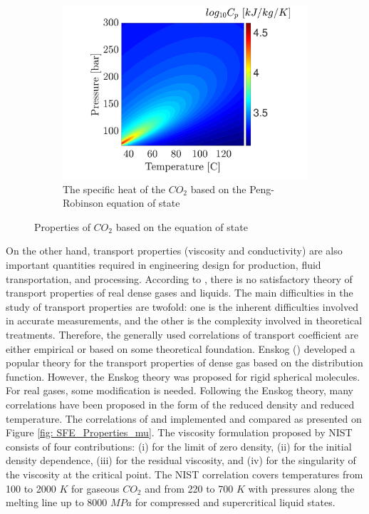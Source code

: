 \documentclass[../Article_Model_Parameters.tex]{subfiles}
\begin{document}
\begin{figure}[H]
			\hfill
			\begin{subfigure}[b]{0.95\textwidth}
				\centering
				\includegraphics[trim = 2.9cm 7cm 3.cm 7cm,clip,width=\textwidth]{Figures/CP.pdf}	
				\caption{The specific heat of the $CO_2$ based on the Peng-Robinson equation of state}
                \label{fig: SFE_Properties_CP}
			\end{subfigure}
			\caption{Properties of $CO_2$ based on the equation of state}
			\label{fig: SFE_Properties}
		\end{figure}    

        On the other hand, transport properties (viscosity and conductivity) are also important quantities required in engineering design for production, fluid transportation, and processing. According to \citet{Sheng1989}, there is no satisfactory theory of transport properties of real dense gases and liquids. The main difficulties in the study of transport properties are twofold: one is the inherent difficulties involved in accurate measurements, and the other is the complexity involved in theoretical treatments. Therefore, the generally used correlations of transport coefficient are either empirical or based on some theoretical foundation. Enskog () developed a popular theory for the transport properties of dense gas based on the distribution function. However, the Enskog theory was proposed for rigid spherical molecules. For real gases, some modification is needed. Following the Enskog theory, many correlations have been proposed in the form of the reduced density and reduced temperature. The correlations of \citet{Fenghour1998} and \citet{Laesecke2017} implemented and compared as presented on Figure \ref{fig: SFE_Properties_mu}. The viscosity formulation proposed by NIST consists of four contributions: (i) for the limit of zero density, (ii) for the initial density dependence, (iii) for the residual viscosity, and (iv) for the singularity of the viscosity at the critical point. The NIST correlation covers temperatures from 100 to 2000 $K$ for gaseous $CO_2$ and from 220 to 700 $K$ with pressures along the melting line up to 8000 $MPa$ for compressed and supercritical liquid states. 
			
\end{document}
